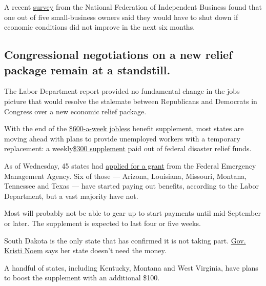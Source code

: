 A recent
\href{https://www.nfib.com/content/press-release/economy/one-in-five-small-businesses-say-they-will-have-to-close-their-doors-if-economic-conditions-dont-improve-in-next-six-months/}{survey}
from the National Federation of Independent Business found that one out
of five small-business owners said they would have to shut down if
economic conditions did not improve in the next six months.

\hypertarget{congressional-negotiations-on-a-new-relief-package-remain-at-a-standstill}{%
\subsection{Congressional negotiations on a new relief package remain at
a
standstill.}\label{congressional-negotiations-on-a-new-relief-package-remain-at-a-standstill}}

The Labor Department report provided no fundamental change in the jobs
picture that would resolve the stalemate between Republicans and
Democrats in Congress over a new economic relief package.

With the end of the
\href{https://www.nytimes3xbfgragh.onion/2020/07/29/business/economy/unemployment-benefits-coronavirus.html?action=click\&module=RelatedLinks\&pgtype=Article}{\$600-a-week
jobless} benefit supplement, most states are moving ahead with plans to
provide unemployed workers with a temporary replacement: a
weekly\href{https://www.nytimes3xbfgragh.onion/article/stimulus-unemployment-payment-benefit.html}{\$300
supplement} paid out of federal disaster relief funds.

As of Wednesday, 45 states had
\href{https://www.fema.gov/fact-sheet/lost-wages-assistance-approved-states}{applied
for a grant} from the Federal Emergency Management Agency. Six of those
--- Arizona, Louisiana, Missouri, Montana, Tennessee and Texas --- have
started paying out benefits, according to the Labor Department, but a
vast majority have not.

Most will probably not be able to gear up to start payments until
mid-September or later. The supplement is expected to last four or five
weeks.

South Dakota is the only state that has confirmed it is not taking part.
\href{https://www.nytimes3xbfgragh.onion/2020/08/16/us/elections/south-dakota-governor-turns-down-extra-unemployment-funding-saying-the-state-doesnt-need-it.html}{Gov.
Kristi Noem} says her state doesn't need the money.

A handful of states, including Kentucky, Montana and West Virginia, have
plans to boost the supplement with an additional \$100.

